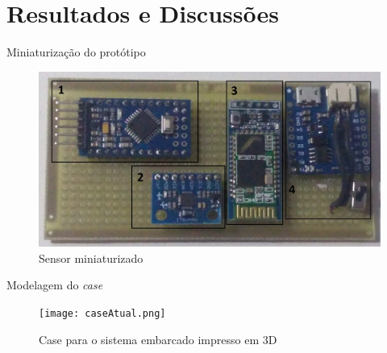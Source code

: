 \documentclass[12pt]{beamer}
\begin{document}
\section{Resultados e Discussões}
\begin{frame}{Miniaturização do protótipo}
    \begin{figure}[H]
    \centering
    \includegraphics[width=\textwidth]{pcbfinal.jpg}
    \caption{Sensor miniaturizado}
    \label{fig:pcbfinal}
    \end{figure}
\end{frame}

\begin{frame}{Modelagem do \textit{case}}
    \begin{figure}[H]
    \centering
    \texttt{[image: caseAtual.png]}
    \caption{Case para o sistema embarcado impresso em 3D}
    \label{fig:caseImpresso}
    \end{figure}
\end{frame}
\end{document}
